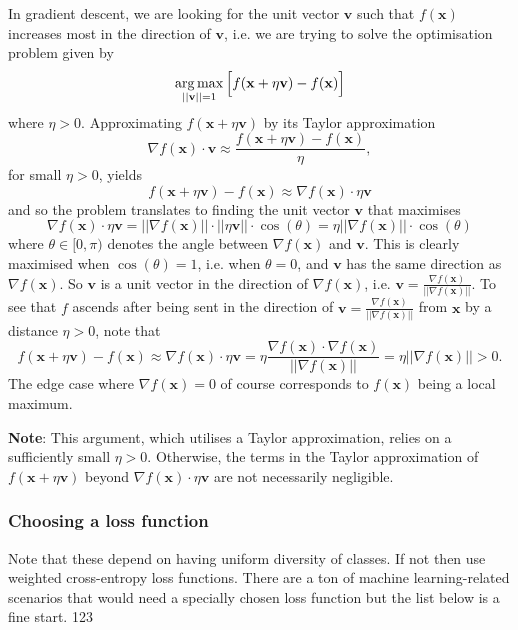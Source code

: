 \documentclass[11pt]{article}
\begin{document}
In gradient descent, we are looking for the unit vector $\mathbf{v}$ such that $f(\mathbf{x})$ increases most in the direction of $\mathbf{v}$, i.e. we are trying to solve the optimisation problem given by
$$\operatorname*{arg\,max}_{||\mathbf{v}||=1}\Big[f(\mathbf{x}+\eta\mathbf{v})-f(\mathbf{x})\Big]$$
where $\eta>0$. Approximating $f(\mathbf{x}+\eta\mathbf{v})$ by its Taylor approximation
$$
\nabla f(\mathbf{x})\cdot\mathbf{v}\approx\frac{f(\mathbf{x}+\eta\mathbf{v})-f(\mathbf{x})}{\eta},
$$
for small $\eta>0$, yields
$$
f(\mathbf{x}+\eta\mathbf{v})-f(\mathbf{x})
\approx
\nabla f(\mathbf{x})\cdot\eta\mathbf{v}
$$
and so the problem translates to finding the unit vector $\mathbf{v}$ that maximises
$$
\nabla f(\mathbf{x})\cdot\eta\mathbf{v}=||\nabla f(\mathbf{x})||\cdot||\eta\mathbf{v}||\cdot\cos(\theta)=\eta||\nabla f(\mathbf{x})||\cdot\cos(\theta)
$$
where $\theta\in[0,\pi)$ denotes the angle between $\nabla f(\mathbf{x})$ and $\mathbf{v}$. This is clearly maximised when $\cos(\theta)=1$, i.e. when $\theta=0$, and $\mathbf{v}$ has the same direction as $\nabla f(\mathbf{x})$. So $\mathbf{v}$ is a unit vector in the direction of $\nabla f(\mathbf{x})$, i.e. $\mathbf{v}=\frac{\nabla f(\mathbf{x})}{||\nabla f(\mathbf{x})||}$. To see that $f$ ascends after being sent in the direction of $\mathbf{v}=\frac{\nabla f(\mathbf{x})}{||\nabla f(\mathbf{x})||}$ from $\mathbf{x}$ by a distance $\eta>0$, note that
$$
f(\mathbf{x}+\eta\mathbf{v})-f(\mathbf{x})
\approx
\nabla f(\mathbf{x})\cdot\eta\mathbf{v}
=
\eta\frac{\nabla f(\mathbf{x})\cdot\nabla f(\mathbf{x})}{||\nabla f(\mathbf{x})||}
=
\eta||\nabla f(\mathbf{x})||
>
0.
$$
The edge case where $\nabla f(\mathbf{x})=0$ of course corresponds to $f(\mathbf{x})$ being a local maximum.

\vspace{10pt}

\noindent\textbf{Note}: This argument, which utilises a Taylor approximation, relies on a sufficiently small $\eta>0$. Otherwise, the terms in the Taylor approximation of $f(\mathbf{x}+\eta\mathbf{v})$ beyond $\nabla f(\mathbf{x})\cdot\eta\mathbf{v}$ are not necessarily negligible.

\subsubsection{Choosing a loss function}
Note that these depend on having uniform diversity of classes. If not then use weighted cross-entropy loss functions. There are a ton of machine learning-related scenarios that would need a specially chosen loss function but the list below is a fine start. 123
\end{document}
